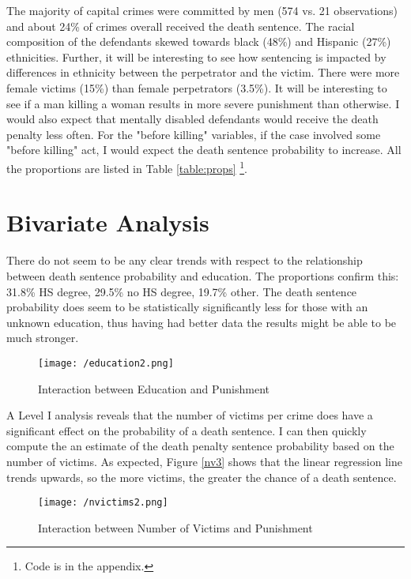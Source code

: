 \documentclass{article}
\begin{document}
The majority of capital crimes were committed by men (574 vs. 21 observations) and about 24\% of crimes overall received the death sentence. The racial composition of the defendants skewed towards black (48\%) and Hispanic (27\%) ethnicities. Further, it will be interesting to see how sentencing is impacted by differences in ethnicity between the perpetrator and the victim. There were more female victims (15\%) than female perpetrators (3.5\%). It will be interesting to see if a man killing a woman results in more severe punishment than otherwise. I would also expect that mentally disabled defendants would receive the death penalty less often. For the "before killing" variables, if the case involved some "before killing" act, I would expect the death sentence probability to increase. All the proportions are listed in Table \ref{table:props} \footnote{Code is in the appendix.}.

\newpage

\section{Bivariate Analysis}

There do not seem to be any clear trends with respect to the relationship between death sentence probability and education. The proportions confirm this: 31.8\% HS degree,  29.5\% no HS degree, 19.7\% other. The death sentence probability does seem to be statistically significantly less for those with an unknown education, thus having had better data the results might be able to be much stronger. 

\begin{figure}[!htb]
    \centering
    \texttt{[image: /education2.png]}
    \caption{Interaction between Education and Punishment}
    \label{ed2}
\end{figure}

A Level I analysis reveals that the number of victims per crime does have a significant effect on the probability of a death sentence. I can then quickly compute the an estimate of the death penalty sentence probability based on the number of victims. As expected, Figure \ref{nv3} shows that the linear regression line trends upwards, so the more victims, the greater the chance of a death sentence. 

\begin{figure}[!htb]
    \centering
    \texttt{[image: /nvictims2.png]}
    \caption{Interaction between Number of Victims and Punishment}
    \label{nv2}
\end{figure}
\end{document}
